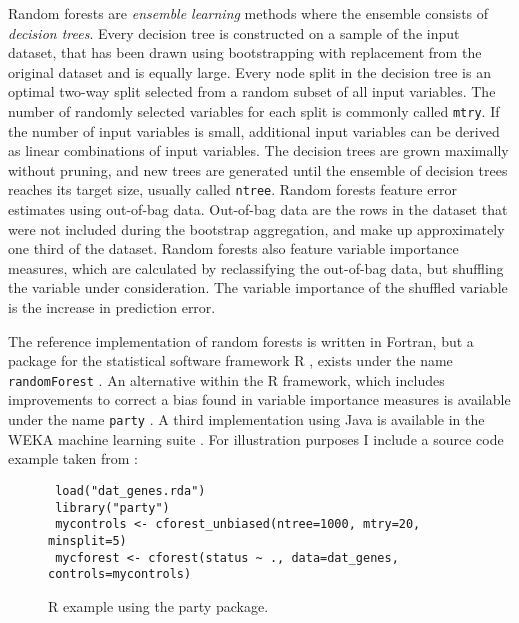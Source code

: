 \documentclass[a4paper,man,12pt,apacite,floatsintext,draftfirst]{apa6} %
\begin{document}
Random forests are \emph{ensemble learning} methods where the ensemble consists
of \emph{decision trees}.
Every decision tree is constructed on a sample of the input dataset,
that has been drawn using bootstrapping with replacement from the original
dataset and is equally large.
Every node split in the decision tree is an optimal two-way split selected
from a random subset of all input variables.
The number of randomly selected variables for each split is commonly called
\texttt{mtry}.
If the number of input variables is small, additional input variables can be
derived as linear combinations of input variables.
The decision trees are grown maximally without pruning,
and new trees are generated until the ensemble of decision trees reaches its
target size, usually called \texttt{ntree}.
Random forests feature error estimates using out-of-bag data.
Out-of-bag data are the rows in the dataset that were not included during
the bootstrap aggregation, and make up approximately one third of the dataset.
Random forests also feature variable importance measures,
which are calculated by reclassifying the out-of-bag data,
but shuffling the variable under consideration.
The variable importance of the shuffled variable is the increase in
prediction error.

The reference implementation of random forests is written in Fortran,
but a package for the statistical software framework R \cite{rproject2012},
exists under the name \texttt{randomForest} \cite{liaw2002classification}.
An alternative within the R framework, which includes improvements
to correct a bias found in variable
importance measures is available under the name \texttt{party}
\cite{strobl2008conditional}.
A third implementation using Java is available in the WEKA machine learning
suite \cite{hall2009weka}.
For illustration purposes I include a source code example taken from
:

\begin{figure}[H]
\caption{R example using the party package.}
\begin{verbatim}
 load("dat_genes.rda")
 library("party")
 mycontrols <- cforest_unbiased(ntree=1000, mtry=20, minsplit=5)
 mycforest <- cforest(status ~ ., data=dat_genes, controls=mycontrols)
\end{verbatim}
\end{figure}
\end{document}
